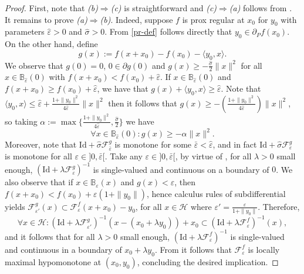 \documentclass[smallextended,envcountsect,envcountsame]{svjour3}
\renewcommand{\H}{\mathcal{H}}
\renewcommand{\epsilon}{\varepsilon}
\newcommand{\1}{\mathds{1}}
\begin{document}
	\begin{proof}
		First, note that \emph{(b)}$\Rightarrow$\emph{(c)} is straightforward and \emph{(c)}$\Rightarrow$\emph{(a)} follows from 
		\cite[Theorem 11.50]{MR4659163}. It remains to prove \emph{(a)}$\Rightarrow$\emph{(b)}. Indeed, suppose $f$ is prox regular at $x_0$ for $y_0$ with parameters $\hat \epsilon>0$ and $\hat\sigma>0$. From \eqref{pr-def} follows directly that $y_0\in \partial_P f(x_0)$. On the other hand, define 
        \begin{equation*}
            g(x) := f(x+x_0) - f(x_0) -\langle y_0,x\rangle.
        \end{equation*}
        We observe that $g(0) = 0$, $0\in \partial g(0)$ and $g(x)\geq -\frac{\hat\sigma}{2}\|x\|^2$ for all $x\in \mathbb{B}_{\hat\epsilon}(0)$ with $f(x+x_0)<f(x_0)+\hat\epsilon$. If $x\in \mathbb{B}_{\hat\epsilon}(0)$ and $f(x+x_0)\geq f(x_0) + \hat\epsilon$, we have that $g(x) + \langle y_0,x\rangle\geq \hat\epsilon$. Note that $\langle y_0,x\rangle\leq \hat \epsilon + \frac{1+\|y_0\|^2}{4\hat \epsilon}\|x\|^2$ then it follows that $g(x)\geq -(\frac{1+\|y_0\|^2}{4\hat\epsilon})\|x\|^2$, so taking $\alpha := \max\{ \frac{1+\|y_0\|^2}{4\hat\epsilon},\frac{\hat\sigma}{2} \}$ we have 
        \begin{equation*}
            \forall x\in \mathbb{B}_{\hat\epsilon}(0) : g(x) \geq -\alpha\|x\|^2.
        \end{equation*}
        Moreover, note that $\text{Id} + \hat\sigma\mathscr{F}_{\bar \epsilon}^g$ is monotone for some $\bar\epsilon<\hat\epsilon$, and in fact $\text{Id} + \hat\sigma\mathscr{F}_{\epsilon}^g$ is monotone for all $\epsilon\in ]0,\bar\epsilon[$. Take any $\epsilon\in ]0,\bar\epsilon[$, by virtue of \cite[Lemma 11.51]{MR4659163}, for all $\lambda>0$ small enough, $(\text{Id} + \lambda\mathscr{F}_\epsilon^{g})^{-1}$ is single-valued and continuous on a boundary of $0$. We also observe that if $x\in \mathbb{B}_{\epsilon}(x)$ and $g(x)<\epsilon$, then $f(x+x_0)<f(x_0) + \epsilon(1+\|y_0\|)$, hence calculus rules of subdifferential yields $\mathscr{F}_{\epsilon'}^g(x) \subset \mathscr{F}_\epsilon^f(x+x_0)-y_0$, for all $x\in \H$ where $\epsilon' = \frac{\epsilon}{1+\|y_0\|}$. Therefore, 
        \begin{equation*}
            \forall x\in \H :(\text{Id}+\lambda\mathscr{F}_{\epsilon'}^g)^{-1}(x -(x_0+\lambda y_0))+x_0\subset (\text{Id} + \lambda\mathscr{F}_\epsilon^f)^{-1}(x),
        \end{equation*}
 and it follows that for all $\lambda>0$ small enough, $(\text{Id} + \lambda\mathscr{F}_\epsilon^f)^{-1}$ is single-valued and continuous in a boundary of $x_0+\lambda y_0$. From \cite[Theorem 8.5]{MR4769808} it follows that $\mathscr{F}_\epsilon^{f}$ is locally maximal hypomonotone at $(x_0,y_0)$, concluding the desired implication.
	\end{proof}
	
\end{document}

